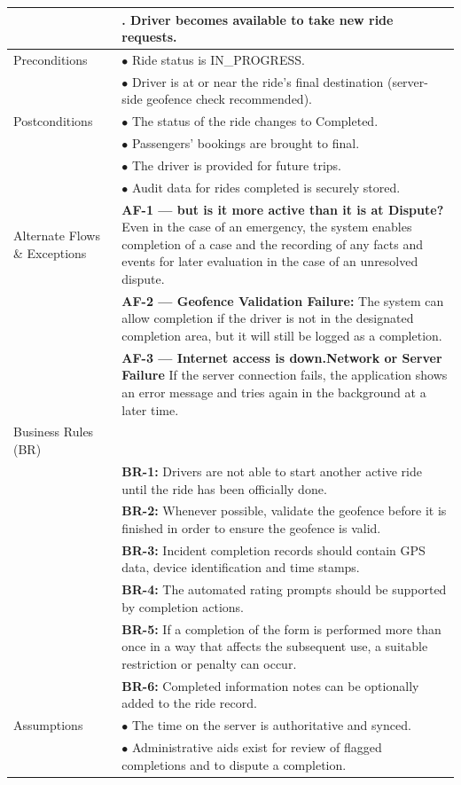 \begin{longtable}{|>{\raggedright\arraybackslash}p{4cm}|>{\raggedright\arraybackslash}p{11cm}|}
& 8. Driver becomes available to take new ride requests. \\
\hline
Preconditions & $\bullet$ Ride status is IN\_PROGRESS. \\
& $\bullet$ Driver is at or near the ride's final destination (server-side geofence check recommended). \\
\hline
Postconditions & $\bullet$ The status of the ride changes to Completed. \\
& $\bullet$ Passengers' bookings are brought to final. \\
& $\bullet$ The driver is provided for future trips. \\
& $\bullet$ Audit data for rides completed is securely stored. \\
\hline
Alternate Flows \& Exceptions & \textbf{AF-1 — but is it more active than it is at Dispute?} \newline Even in the case of an emergency, the system enables completion of a case and the recording of any facts and events for later evaluation in the case of an unresolved dispute. \\
& \textbf{AF-2 — Geofence Validation Failure:} \newline The system can allow completion if the driver is not in the designated completion area, but it will still be logged as a completion. \\
& \textbf{AF-3 — Internet access is down.Network or Server Failure} \newline If the server connection fails, the application shows an error message and tries again in the background at a later time.\\
\hline
Business Rules (BR) & \\
& \textbf{BR-1:} Drivers are not able to start another active ride until the ride has been officially done. \\
& \textbf{BR-2:} Whenever possible, validate the geofence before it is finished in order to ensure the geofence is valid. \\
& \textbf{BR-3:} Incident completion records should contain GPS data, device identification and time stamps. \\
& \textbf{BR-4:} The automated rating prompts should be supported by completion actions. \\
& \textbf{BR-5:} If a completion of the form is performed more than once in a way that affects the subsequent use, a suitable restriction or penalty can occur. \\
& \textbf{BR-6:} Completed information notes can be optionally added to the ride record. \\
\hline
Assumptions & $\bullet$ The time on the server is authoritative and synced. \\
& $\bullet$ Administrative aids exist for review of flagged completions and to dispute a completion. \\
\hline
\end{longtable}
